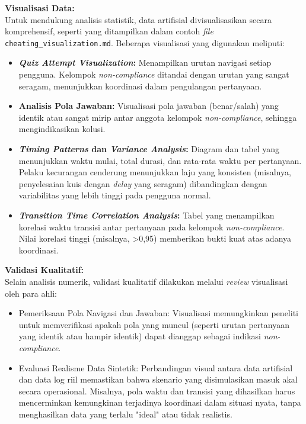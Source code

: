 \textbf{Visualisasi Data:} \\
Untuk mendukung analisis statistik, data artifisial divisualisasikan secara komprehensif, seperti yang ditampilkan dalam contoh \textit{file} \texttt{cheating\_visualization.md}. Beberapa visualisasi yang digunakan meliputi:
\begin{itemize}
    \item \textbf{\textit{Quiz Attempt Visualization}:} Menampilkan urutan navigasi setiap pengguna. Kelompok \textit{non-compliance} ditandai dengan urutan yang sangat seragam, menunjukkan koordinasi dalam pengulangan pertanyaan.
    \item \textbf{Analisis Pola Jawaban:} Visualisasi pola jawaban (benar/salah) yang identik atau sangat mirip antar anggota kelompok \textit{non-compliance}, sehingga mengindikasikan kolusi.
    \item \textbf{\textit{Timing Patterns} dan \textit{Variance Analysis}:} Diagram dan tabel yang menunjukkan waktu mulai, total durasi, dan rata-rata waktu per pertanyaan. Pelaku kecurangan cenderung menunjukkan laju yang konsisten (misalnya, penyelesaian kuis dengan \textit{delay} yang seragam) dibandingkan dengan variabilitas yang lebih tinggi pada pengguna normal.
    \item \textbf{\textit{Transition Time Correlation Analysis}:} Tabel yang menampilkan korelasi waktu transisi antar pertanyaan pada kelompok \textit{non-compliance}. Nilai korelasi tinggi (misalnya, >0,95) memberikan bukti kuat atas adanya koordinasi.
\end{itemize}

\textbf{Validasi Kualitatif:} \\
Selain analisis numerik, validasi kualitatif dilakukan melalui \textit{review} visualisasi oleh para ahli:
\begin{itemize}
    \item Pemeriksaan Pola Navigasi dan Jawaban: Visualisasi memungkinkan peneliti untuk memverifikasi apakah pola yang muncul (seperti urutan pertanyaan yang identik atau hampir identik) dapat dianggap sebagai indikasi \textit{non-compliance}.
    \item Evaluasi Realisme Data Sintetik: Perbandingan visual antara data artifisial dan data log riil memastikan bahwa skenario yang disimulasikan masuk akal secara operasional. Misalnya, pola waktu dan transisi yang dihasilkan harus mencerminkan kemungkinan terjadinya koordinasi dalam situasi nyata, tanpa menghasilkan data yang terlalu "ideal" atau tidak realistis.
\end{itemize}

